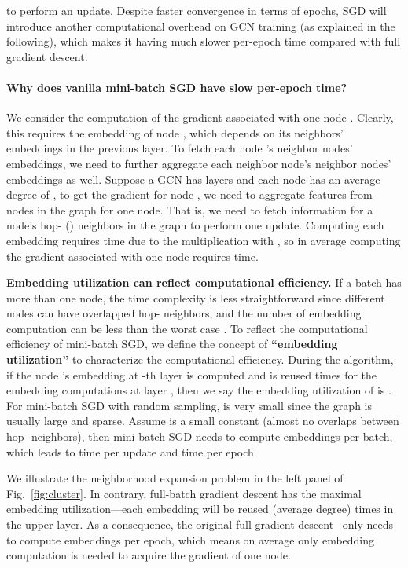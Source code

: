\documentclass[sigconf]{acmart}
\begin{document}
to perform an update. 
Despite faster convergence in terms of epochs, SGD will introduce another computational overhead on GCN training (as explained in the following), which makes it having much slower per-epoch time compared with full gradient descent. 
\noindent\paragraph{\bf {Why does vanilla mini-batch SGD  have slow per-epoch time? }} 
We consider the computation of the gradient associated with one node . 
Clearly, this requires  the embedding of node , which depends on its neighbors' embeddings in the previous layer. 
To fetch each node 's neighbor nodes' embeddings, we need to further aggregate each neighbor node's neighbor nodes' embeddings as well.
Suppose a GCN has  layers and each node has an average degree of , to get the gradient for node , we need to aggregate features from  nodes in the graph for one node. That is, we need to fetch information for a node's hop- () neighbors in the graph to perform one update.
Computing each embedding requires  time due to the multiplication with , so in average computing the gradient associated with one node requires  time.

{\bf Embedding utilization can reflect computational efficiency. }
If a batch has more than one node, the time complexity is less straightforward since different nodes can have overlapped hop- neighbors, and the number of embedding computation can be less than the worst case . 
To reflect the computational efficiency of mini-batch SGD, we define the concept of {\bf ``embedding utilization''} to characterize the computational efficiency. During the algorithm, if the node 's embedding at -th layer  is computed and is reused  times for the embedding computations at layer , then we say the embedding utilization of  is . For mini-batch SGD with random sampling,  is very small since the graph is usually large and sparse. 
Assume  is a small constant (almost no overlaps between hop- neighbors), then mini-batch SGD needs to compute  embeddings per batch, which leads to  time per update and  time per epoch. 

We illustrate the neighborhood expansion problem in the left panel of Fig.~\ref{fig:cluster}. 
In contrary, full-batch gradient descent has the maximal embedding utilization---each embedding will be reused  (average degree) times in the upper layer. 
As a consequence, the original full gradient descent~\cite{kipf2017semi} only needs to compute  embeddings per epoch, which means on average only  embedding computation is needed to acquire the gradient of one node.  
\end{document}
